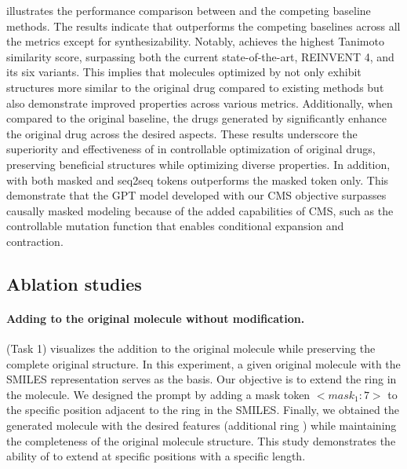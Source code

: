  illustrates the performance comparison between \algname and the competing baseline methods. The results indicate that \algname outperforms the competing baselines across all the metrics except for synthesizability. Notably, \algname achieves the highest Tanimoto similarity score, surpassing both the current state-of-the-art, REINVENT 4, and its six variants. This implies that molecules optimized by \algname not only exhibit structures more similar to the original drug compared to existing methods but also demonstrate improved properties across various metrics. Additionally, when compared to the original baseline, the drugs generated by \algname significantly enhance the original drug across the desired aspects.
These results underscore the superiority and effectiveness of \algname in controllable optimization of original drugs, preserving beneficial structures while optimizing diverse properties. 
In addition, \algname with both masked and seq2seq tokens outperforms the masked token only. This demonstrate that the GPT model developed with our CMS objective surpasses causally masked modeling because of the added capabilities of CMS, such as the controllable mutation function that enables conditional expansion and contraction.








\subsection{Ablation studies}

\vspace{-0.1cm}
\paragraph{Adding to the original molecule without modification.} 
 (Task 1) visualizes the addition to the original molecule while preserving the complete original structure. In this experiment, a given original molecule with the SMILES representation  serves as the basis. Our objective is to extend the ring in the molecule. We designed the prompt by adding a mask token $<mask_1:7>$ to the specific position adjacent to the ring in the SMILES. Finally, we obtained the generated molecule with the desired features (additional ring {\color{red}{in red}}) while maintaining the completeness of the original molecule structure. This study demonstrates the ability of \algname to extend at specific positions with a specific length.


